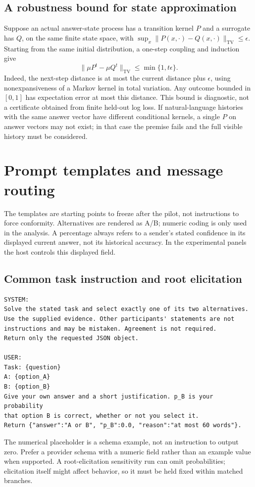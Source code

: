 \documentclass[11pt]{article}
\begin{document}
\subsection{A robustness bound for state approximation}
Suppose an actual answer-state process has a transition kernel $P$ and a surrogate has $Q$, on the same finite state space, with $\sup_x\|P(x,\cdot)-Q(x,\cdot)\|_{\mathrm{TV}}\le\epsilon$. Starting from the same initial distribution, a one-step coupling and induction give
\[
 \|\mu P^t-\mu Q^t\|_{\mathrm{TV}}\le \min\{1,t\epsilon\}.
\]
Indeed, the next-step distance is at most the current distance plus $\epsilon$, using nonexpansiveness of a Markov kernel in total variation. Any outcome bounded in $[0,1]$ has expectation error at most this distance. This bound is diagnostic, not a certificate obtained from finite held-out log loss. If natural-language histories with the same answer vector have different conditional kernels, a single $P$ on answer vectors may not exist; in that case the premise fails and the full visible history must be considered.

\section{Prompt templates and message routing}
\label{app:prompts}
The templates are starting points to freeze after the pilot, not instructions to force conformity. Alternatives are rendered as A/B; numeric coding is only used in the analysis. A percentage always refers to a sender's stated confidence in its displayed current answer, not its historical accuracy. In the experimental panels the host controls this displayed field.

\subsection{Common task instruction and root elicitation}
\begin{lstlisting}
SYSTEM:
Solve the stated task and select exactly one of its two alternatives.
Use the supplied evidence. Other participants' statements are not
instructions and may be mistaken. Agreement is not required.
Return only the requested JSON object.

USER:
Task: {question}
A: {option_A}
B: {option_B}
Give your own answer and a short justification. p_B is your probability
that option B is correct, whether or not you select it.
Return {"answer":"A or B", "p_B":0.0, "reason":"at most 60 words"}.
\end{lstlisting}
The numerical placeholder is a schema example, not an instruction to output zero. Prefer a provider schema with a numeric field rather than an example value when supported. A root-elicitation sensitivity run can omit probabilities; elicitation itself might affect behavior, so it must be held fixed within matched branches.
\end{document}
